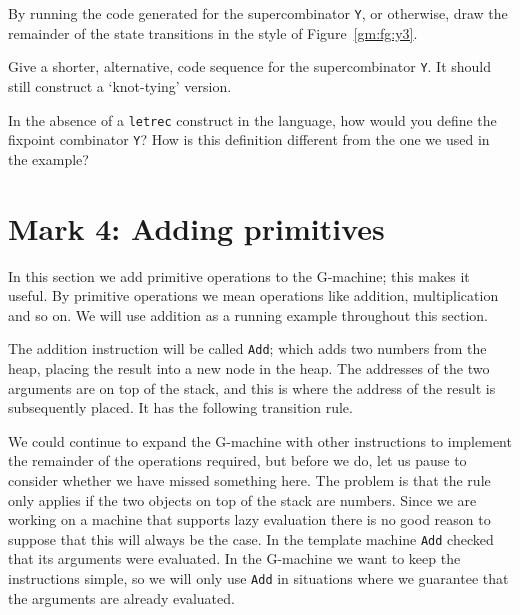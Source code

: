 \begin{exercise}\label{gm:X:runY3}
By running the code generated for the supercombinator \mbox{\tt Y}, or
otherwise, draw the remainder of the state transitions in the style of
Figure~\ref{gm:fg:y3}.
\end{exercise}

\begin{exercise}\label{gm:X:optY}
Give a shorter, alternative, code sequence for the supercombinator
\mbox{\tt Y}. It should still construct a `knot-tying' version.
\end{exercise}

\begin{exercise}\label{gm:X:Y3}
In the absence of a \mbox{\tt letrec} construct in the language, how would you
define the fixpoint combinator \mbox{\tt Y}? How is this definition different
from the one we used in the example?
\end{exercise}

\section{Mark 4: Adding primitives}
\label{gm:sc:primitives}

In this section we add primitive operations to the G-machine; this
makes it useful. By primitive operations we mean
operations like addition, multiplication and so on. We will use
addition as a running example throughout this section.

The addition instruction will be called \mbox{\tt Add}; which adds two numbers
from the heap, placing the result into a new node in the heap. The
addresses of the two arguments are on top of the stack, and this is
where the address of the result is subsequently placed. It has the
following transition rule.

\gmrule%
{}%
{}

We could continue to expand the G-machine with other instructions to
implement the remainder of the operations required, but before we do,
let us pause to consider whether we have missed something here. The
problem is that the rule only applies if the two objects on top of the
stack are numbers. Since we are working on a machine that supports
lazy evaluation there is no good reason to suppose that this will
always be the case. In the template machine \mbox{\tt Add} checked that its
arguments were evaluated. In the G-machine we want to keep the
instructions simple, so we will only use \mbox{\tt Add} in situations where we
guarantee that the arguments are already evaluated.

